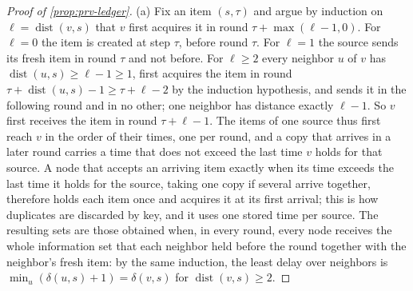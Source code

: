 \begin{proof}[Proof of \cref{prop:prv-ledger}]
(a) Fix an item $(s,\tau)$ and argue by induction on $\ell=\operatorname{dist}(v,s)$ that $v$ first acquires it in round $\tau+\max(\ell-1,0)$. For $\ell=0$ the item is created at step $\tau$, before round $\tau$. For $\ell=1$ the source sends its fresh item in round $\tau$ and not before. For $\ell\ge2$ every neighbor $u$ of $v$ has $\operatorname{dist}(u,s)\ge\ell-1\ge1$, first acquires the item in round $\tau+\operatorname{dist}(u,s)-1\ge\tau+\ell-2$ by the induction hypothesis, and sends it in the following round and in no other; one neighbor has distance exactly $\ell-1$. So $v$ first receives the item in round $\tau+\ell-1$. The items of one source thus first reach $v$ in the order of their times, one per round, and a copy that arrives in a later round carries a time that does not exceed the last time $v$ holds for that source. A node that accepts an arriving item exactly when its time exceeds the last time it holds for the source, taking one copy if several arrive together, therefore holds each item once and acquires it at its first arrival; this is how duplicates are discarded by key, and it uses one stored time per source. The resulting sets are those obtained when, in every round, every node receives the whole information set that each neighbor held before the round together with the neighbor's fresh item: by the same induction, the least delay over neighbors is $\min_u(\delta(u,s)+1)=\delta(v,s)$ for $\operatorname{dist}(v,s)\ge2$.


\end{proof}
